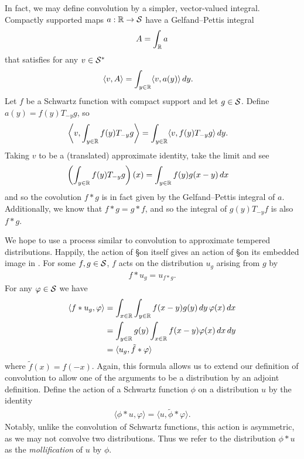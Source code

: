     In fact, we may define convolution by a simpler, vector-valued integral.
    Compactly supported  maps $a:\R\rightarrow\S$ have a Gelfand--Pettis integral 
    \begin{align*}
      A = \int_\R a
    \end{align*}
    that satisfies for any $v\in\SS$
    \begin{align*}
      \langle v, A\rangle
      &= \int_{y\in\R} \langle v, a(y)\rangle\,dy \text{.}
    \end{align*}
    Let $f$ be a Schwartz function with compact support and let $g\in\S$.
    Define $a(y)=f(y)T_{-y}g$, so
    \begin{align*}
      \left\langle v, \int_{y\in\R} f(y)T_{-y}g \right\rangle
      &= \int_{y\in\R} \langle v, f(y)T_{-y}g\rangle\, dy \text{.}
    \end{align*}
    Taking $v$ to be a (translated) approximate identity, take the limit and see
    \begin{align*}
      \left( \int_{y\in\R} f(y)T_{-y}g \right)(x)
      &= \int_{y\in\R} f(y)g(x-y)\,dx
    \end{align*}
    and so the covolution $f*g$ is in fact given by the Gelfand--Pettis integral of $a$.
    Additionally, we know that $f*g=g*f$, and so the integral of $g(y)T_{-y}f$ is also $f*g$.

    We hope to use a process similar to convolution to approximate tempered distributions.
    Happily, the action of \S on itself gives an action of \S on its embedded image in \SS.
    For some $f,g\in\S$, $f$ acts on the distribution $u_g$ arising from $g$ by
    \begin{align*}
      f*u_g = u_{f*g} \text{.}
    \end{align*}
    For any $\varphi\in\S$ we have
    \begin{align*}
      \langle f*u_g, \varphi\rangle
      &= \int_{x\in\R} \int_{y\in\R} f(x-y)g(y)\,dy\,\varphi(x)\,dx
      \\&= \int_{y\in\R} g(y) \int_{x\in\R} f(x-y)\varphi(x)\,dx\,dy
      \\&= \langle u_g, \tilde f*\varphi\rangle
    \end{align*}
    where $\tilde f(x) = f(-x)$.
    Again, this formula allows us to extend our definition of convolution to allow one of the arguments to be a distribution by an adjoint definition.
    Define the action of a Schwartz function $\phi$ on a distribution $u$ by the identity
    \begin{align*}
      \langle \phi*u, \varphi\rangle
      = \langle u, \tilde\phi*\varphi\rangle \text{.}
    \end{align*}
    Notably, unlike the convolution of Schwartz functions, this action is asymmetric, as we may not convolve two distributions.
    Thus we refer to the distribution $\phi*u$ as the \emph{mollification} of $u$ by $\phi$.

